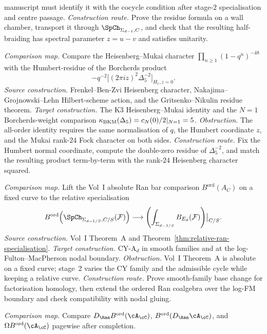 \begin{description}[leftmargin=2.7em,style=nextline,topsep=0.3ex,itemsep=0.6ex]
 manuscript must identify it with the cocycle condition after
 stage-$2$ specialisation and centre passage.
 \emph{Construction route.}
 Prove the residue formula on a wall chamber, transport it through
 $\SpCh_{\Sigma_{d-1},C}$, and check that the resulting half-braiding
 has spectral parameter $z=u-v$ and satisfies unitarity.
 \item[\textbf{CM--HM. Heisenberg--Mukai residue to
 \texorpdfstring{$\Delta_5$}{Delta-5}.}]
 \emph{Comparison map.}
 Compare the Heisenberg--Mukai character
 $\prod_{n\ge1}(1-q^n)^{-48}$ with the Humbert-residue of the
 Borcherds product
 \[
 -q^{-2}\bigl[(2\pi i z)^2\Delta_5^{-2}\bigr]_{H_1,z=0}.
 \]
 \emph{Source construction.}
 Frenkel--Ben-Zvi Heisenberg character, Nakajima--Grojnowski--Lehn
 Hilbert-scheme action, and the Gritsenko--Nikulin residue theorem.
 \emph{Target construction.}
 The K3 Heisenberg--Mukai identity and the $N=1$ Borcherds-weight
 comparison $\kappa_{\mathrm{BKM}}(\Delta_5)=c_N(0)/2|_{N=1}=5$.
 \emph{Obstruction.}
 The all-order identity requires the same normalisation of $q$, the
 Humbert coordinate $z$, and the Mukai rank-$24$ Fock character on
 both sides.
 \emph{Construction route.}
 Fix the Humbert normal coordinate, compute the double-zero residue
 of $\Delta_5^{-2}$, and match the resulting product term-by-term
 with the rank-$24$ Heisenberg character squared.
 \item[\textbf{CM--RA. Relative Ran specialisation beyond Vol~I A.}]
 \emph{Comparison map.}
 Lift the Vol~I absolute Ran bar comparison
 $B^{\mathrm{ord}}(A_C)$ on a fixed curve to the relative
 specialisation
 \[
 B^{\mathrm{ord}}\!\left(\SpCh_{\Sigma_{d-1/S},C/S}(\cF)\right)
 \longrightarrow
 \left(\int_{\Sigma_{d-1/S}} B_{E_d}(\cF)\right)\!\big|_{C/S}.
 \]
 \emph{Source construction.}
 Vol~I Theorem~A and Theorem~\ref{thm:relative-ran-specialisation}.
 \emph{Target construction.}
 CY-A$_d$ in smooth families and at the log-Fulton--MacPherson nodal
 boundary.
 \emph{Obstruction.}
 Vol~I Theorem~A is absolute on a fixed curve; stage~2 varies the
 CY family and the admissible cycle while keeping a relative curve.
 \emph{Construction route.}
 Prove smooth-family base change for factorisation homology, then
 extend the ordered Ran coalgebra over the log-FM boundary and check
 compatibility with nodal gluing.
 \item[\textbf{CM--PV. Positselski-compatible Verdier spectral functor.}]
 \emph{Comparison map.}
 Compare
 \(D_{\Ran}B^{\mathrm{ord}}(\cA_\cC)\),
 \(B^{\mathrm{ord}}(D_{\Ran}\cA_\cC)\), and
 \(\Omega B^{\mathrm{ord}}(\cA_\cC)\) pagewise after completion.

\end{description}
